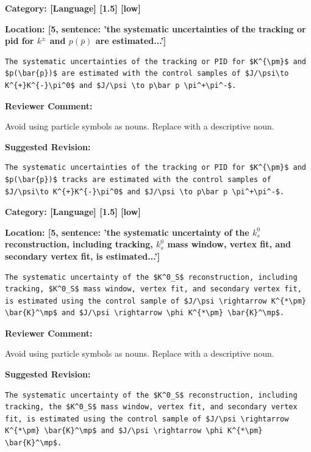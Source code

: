 \documentclass[12pt]{article}
\begin{document}
\begin{reviewer}
\noindent \textbf{Category: [Language] [1.5] [low]}

\noindent \textbf{Location: [5, sentence: 'the systematic uncertainties of the tracking or pid for $k^{\pm}$ and $p(\bar{p})$ are estimated...']}

\begin{lstlisting}[breaklines=true]
	The systematic uncertainties of the tracking or PID for $K^{\pm}$ and $p(\bar{p})$ are estimated with the control samples of $J/\psi\to K^{+}K^{-}\pi^0$ and $J/\psi \to p\bar p \pi^+\pi^-$.
\end{lstlisting}

\textbf{Reviewer Comment:}

Avoid using particle symbols as nouns. Replace with a descriptive noun.

\textbf{Suggested Revision:}

\begin{lstlisting}[breaklines=true]
	The systematic uncertainties of the tracking or PID for $K^{\pm}$ and $p(\bar{p})$ tracks are estimated with the control samples of $J/\psi\to K^{+}K^{-}\pi^0$ and $J/\psi \to p\bar p \pi^+\pi^-$.
\end{lstlisting}

\end{reviewer}

\begin{reviewer}
\noindent \textbf{Category: [Language] [1.5] [low]}

\noindent \textbf{Location: [5, sentence: 'the systematic uncertainty of the $k^0_s$ reconstruction, including tracking, $k^0_s$ mass window, vertex fit, and secondary vertex fit, is estimated...']}

\begin{lstlisting}[breaklines=true]
	The systematic uncertainty of the $K^0_S$ reconstruction, including tracking, $K^0_S$ mass window, vertex fit, and secondary vertex fit, is estimated using the control sample of $J/\psi \rightarrow K^{*\pm} \bar{K}^\mp$ and $J/\psi \rightarrow \phi K^{*\pm} \bar{K}^\mp$.
\end{lstlisting}

\textbf{Reviewer Comment:}

Avoid using particle symbols as nouns. Replace with a descriptive noun.

\textbf{Suggested Revision:}

\begin{lstlisting}[breaklines=true]
	The systematic uncertainty of the $K^0_S$ reconstruction, including tracking, the $K^0_S$ mass window, vertex fit, and secondary vertex fit, is estimated using the control sample of $J/\psi \rightarrow K^{*\pm} \bar{K}^\mp$ and $J/\psi \rightarrow \phi K^{*\pm} \bar{K}^\mp$.
\end{lstlisting}

\end{reviewer}
\end{document}
